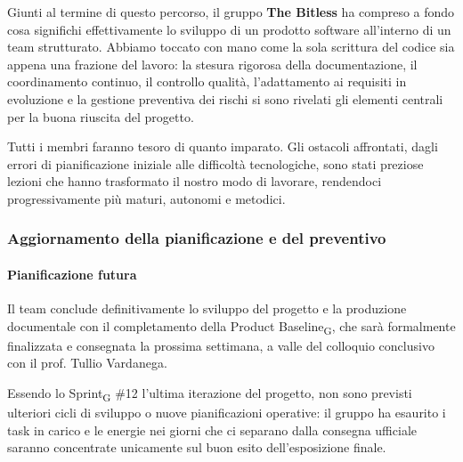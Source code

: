 ﻿\documentclass[a4paper, 10pt, colorlinks=true, linkcolor=black, urlcolor=blue, citecolor=blue, hidelinks]{article}
\begin{document}
Giunti al termine di questo percorso, il gruppo \textbf{The Bitless} ha compreso a fondo cosa significhi effettivamente lo sviluppo di un prodotto software all'interno di un team strutturato. Abbiamo toccato con mano come la sola scrittura del codice sia appena una frazione del lavoro: la stesura rigorosa della documentazione, il coordinamento continuo, il controllo qualità, l'adattamento ai requisiti in evoluzione e la gestione preventiva dei rischi si sono rivelati gli elementi centrali per la buona riuscita del progetto.

Tutti i membri faranno tesoro di quanto imparato. Gli ostacoli affrontati, dagli errori di pianificazione iniziale alle difficoltà tecnologiche, sono stati preziose lezioni che hanno trasformato il nostro modo di lavorare, rendendoci progressivamente più maturi, autonomi e metodici. 

\subsubsection{Aggiornamento della pianificazione e del preventivo}

\paragraph{Pianificazione futura}
Il team conclude definitivamente lo sviluppo del progetto e la produzione documentale con il completamento della Product Baseline\textsubscript{G}, che sarà formalmente finalizzata e consegnata la prossima settimana, a valle del colloquio conclusivo con il prof. Tullio Vardanega. 

Essendo lo Sprint\textsubscript{G} \#12 l'ultima iterazione del progetto, non sono previsti ulteriori cicli di sviluppo o nuove pianificazioni operative: il gruppo ha esaurito i task in carico e le energie nei giorni che ci separano dalla consegna ufficiale saranno concentrate unicamente sul buon esito dell'esposizione finale.
\end{document}
